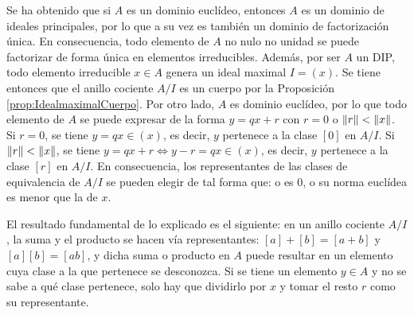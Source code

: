 \begin{obs}
    Se ha obtenido que si $A$ es un dominio euclídeo, entonces $A$ es un dominio de ideales principales, por lo que a su vez es también un dominio de factorización única. En consecuencia, todo elemento de $A$ no nulo no unidad se puede factorizar de forma única en elementos irreducibles. Además, por ser $A$ un DIP, todo elemento irreducible $x\in A$ genera un ideal maximal $I = (x)$. Se tiene entonces que el anillo cociente $A/I$ es un cuerpo por la Proposición \ref{prop:IdealmaximalCuerpo}. Por otro lado, $A$ es dominio euclídeo, por lo que todo elemento de $A$ se puede expresar de la forma $y = qx + r$ con $r = 0 $ o $\|r\| < \|x\|$. Si $r = 0$, se tiene $y = qx \in (x)$, es decir, $y$ pertenece a la clase $[0]$ en $A/I$. Si $\|r\| < \|x\|$, se tiene $y = qx + r \iff y - r = qx \in (x)$, es decir, $y$ pertenece a la clase $[r]$ en $A/I$. En consecuencia, los representantes de las clases de equivalencia de $A/I$ se pueden elegir de tal forma que: o es 0, o su norma euclídea es menor que la de $x$.
    
    \item El resultado fundamental de lo explicado es el siguiente: en un anillo cociente $A/I$, la suma y el producto se hacen vía representantes: $[a] + [b] = [a + b]$ y $[a][b] = [ab]$, y dicha suma o producto en $A$ puede resultar en un elemento cuya clase a la que pertenece se desconozca. Si se tiene un elemento $y\in A$ y no se sabe a qué clase pertenece, solo hay que dividirlo por $x$ y tomar el resto $r$ como su representante. 
    

\end{obs}






\begin{prop}\label{prop:K_cuerpo_K[X]_DE}\end{prop}

